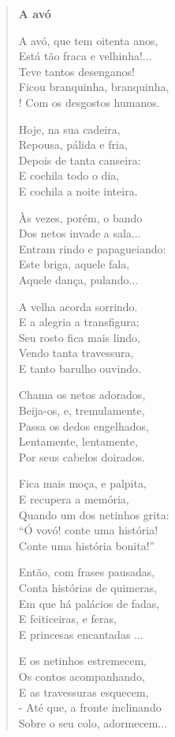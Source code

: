 \begin{verse}
\textbf{A avó}

A avó, que tem oitenta anos,\\
Está tão fraca e velhinha!...\\
Teve tantos desenganos!\\
Ficou branquinha, branquinha,\\!
Com os desgostos humanos.


Hoje, na sua cadeira,\\
Repousa, pálida e fria,\\
Depois de tanta canseira:\\
E cochila todo o dia,\\
E cochila a noite inteira.


Às vezes, porém, o bando\\
Dos netos invade a sala...\\
Entram rindo e papagueiando:\\
Este briga, aquele fala,\\
Aquele dança, pulando...


A velha acorda sorrindo.\\
E a alegria a transfigura;\\
Seu rosto fica mais lindo,\\
Vendo tanta travessura,\\
E tanto barulho ouvindo.


Chama os netos adorados,\\
Beija-os, e, tremulamente,\\
Passa os dedos engelhados,\\
Lentamente, lentamente,\\
Por seus cabelos doirados.


Fica mais moça, e palpita,\\
E recupera a memória,\\
Quando um dos netinhos grita:\\
“Ó vovó! conte uma história!\\
Conte uma história bonita!”


Então, com frases pausadas,\\
Conta histórias de quimeras,\\
Em que há palácios de fadas,\\
E feiticeiras, e feras,\\
E princesas encantadas ...


E os netinhos estremecem,\\
Os contos acompanhando,\\
E as travessuras esquecem,\\
- Até que, a fronte inclinando\\
Sobre o seu colo, adormecem...
\end{verse}

